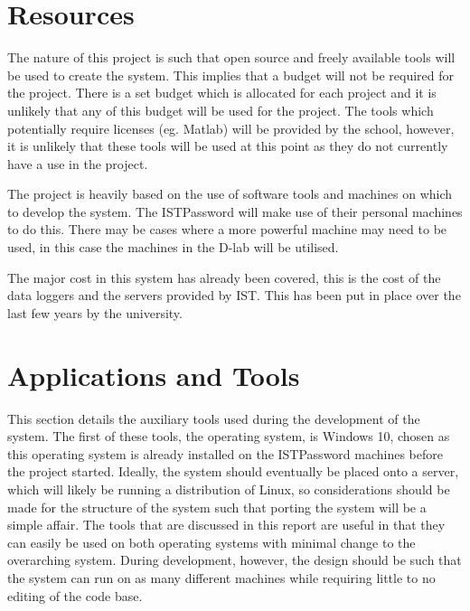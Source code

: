 \documentclass[12pt,onecolumn]{IEEEtran}
\begin{document}

\section{Resources} \label{sec:Resources}
The nature of this project is such that open source and freely available tools will be used to create the system. This implies that a budget will not be required for the project. There is a set budget which is allocated for each project and it is unlikely that any of this budget will be used for the project.
The tools which potentially require licenses (eg. Matlab) will be provided by the school, however, it is unlikely that these tools will be used at this point as they do not currently have a use in the project. 

The project is heavily based on the use of software tools and machines on which to develop the system. The ISTPassword will make use of their personal machines to do this. There may be cases where a more powerful machine may need to be used, in this case the machines in the D-lab will be utilised. 

The major cost in this system has already been covered, this is the cost of the data loggers and the servers provided by IST. This has been put in place over the last few years by the university.





\section{Applications and Tools} \label{sec:ApplicationsAndTools}

This section details the auxiliary tools used during the development of the system.
The first of these tools, the operating system, is Windows 10, chosen as this operating system is already installed on the ISTPassword machines before the project started. %
Ideally, the system should eventually be placed onto a server, which will likely be running a distribution of Linux, so considerations should be made for the structure of the system such that porting the system will be a simple affair. 
The tools that are discussed in this report are useful in that they can easily be used on both operating systems with minimal change to the overarching system. 
During development, however, the design should be such that the system can run on as many different machines while requiring little to no editing of the code base.
\end{document}
